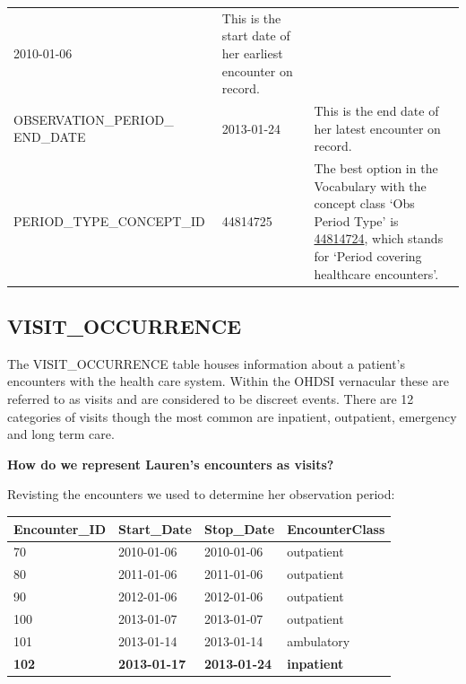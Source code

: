 \documentclass[11pt]{book}
\begin{document}
\begin{longtable}[]{@{}lll@{}}
\begin{minipage}[t]{0.16\columnwidth}
2010-01-06\strut
\end{minipage} & \begin{minipage}[t]{0.42\columnwidth}\raggedright\strut
This is the start date of her earliest encounter on record.\strut
\end{minipage}\tabularnewline
\begin{minipage}[t]{0.33\columnwidth}\raggedright\strut
OBSERVATION\_PERIOD\_ END\_DATE\strut
\end{minipage} & \begin{minipage}[t]{0.16\columnwidth}\raggedright\strut
2013-01-24\strut
\end{minipage} & \begin{minipage}[t]{0.42\columnwidth}\raggedright\strut
This is the end date of her latest encounter on record.\strut
\end{minipage}\tabularnewline
\begin{minipage}[t]{0.33\columnwidth}\raggedright\strut
PERIOD\_TYPE\_CONCEPT\_ID\strut
\end{minipage} & \begin{minipage}[t]{0.16\columnwidth}\raggedright\strut
44814725\strut
\end{minipage} & \begin{minipage}[t]{0.42\columnwidth}\raggedright\strut
The best option in the Vocabulary with the concept class `Obs Period
Type' is
\href{http://athena.ohdsi.org/search-terms/terms/44814724}{44814724},
which stands for `Period covering healthcare encounters'.\strut
\end{minipage}\tabularnewline
\bottomrule
\end{longtable}

\subsection{VISIT\_OCCURRENCE}\label{visitOccurrence}

The VISIT\_OCCURRENCE table houses information about a patient's
encounters with the health care system. Within the OHDSI vernacular
these are referred to as visits and are considered to be discreet
events. There are 12 categories of visits though the most common are
inpatient, outpatient, emergency and long term care.

\textbf{How do we represent Lauren's encounters as visits?}

Revisting the encounters we used to determine her observation period:

\begin{longtable}[]{@{}llll@{}}
\toprule
Encounter\_ID & Start\_Date & Stop\_Date & EncounterClass\tabularnewline
\midrule
\endhead
70 & 2010-01-06 & 2010-01-06 & outpatient\tabularnewline
80 & 2011-01-06 & 2011-01-06 & outpatient\tabularnewline
90 & 2012-01-06 & 2012-01-06 & outpatient\tabularnewline
100 & 2013-01-07 & 2013-01-07 & outpatient\tabularnewline
101 & 2013-01-14 & 2013-01-14 & ambulatory\tabularnewline
\textbf{102} & \textbf{2013-01-17} & \textbf{2013-01-24} &
\textbf{inpatient}\tabularnewline
\bottomrule
\end{longtable}
\end{document}
